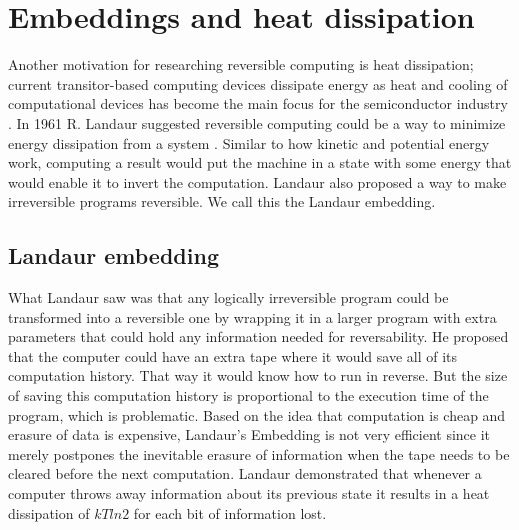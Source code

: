 

\section{Embeddings and heat dissipation}
Another motivation for researching reversible computing is heat dissipation; current transitor-based computing devices dissipate energy as heat and cooling of computational devices has become the main focus for the semiconductor industry \cite{semiconductors_valley}. In 1961 R. Landaur suggested reversible computing could be a way to minimize energy dissipation from a system \cite{Irreversibility_paper}.
Similar to how kinetic and potential energy work, computing a result would put the machine in a state with some energy that would enable it to invert the computation.
Landaur also proposed a way to make irreversible programs reversible. We call this the Landaur embedding.


\subsection{Landaur embedding}
What Landaur saw was that any logically irreversible program could be transformed into a reversible one by wrapping it in a larger program with extra parameters that could hold any information needed for reversability. He proposed that the computer could have an extra tape where it would save all of its computation history. That way it would know how to run in reverse. But the size of saving this computation history is proportional to the execution time of the program, which is problematic.
Based on the idea that computation is cheap and erasure of data is expensive, Landaur's Embedding is not very efficient since it merely postpones the inevitable erasure of information when the tape needs to be cleared before the next computation.
Landaur demonstrated that whenever a computer throws away information about its previous state it results in a heat dissipation of $kT ln 2$ for each bit of information lost.
